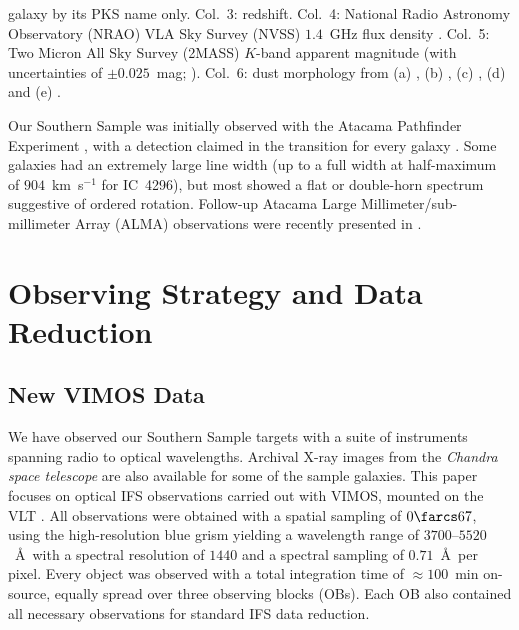 \documentclass[a4paper,fleqn,usenatbib]{mnras}
\begin{document}
\begin{table}[t]
\begin{center}
{      galaxy by its PKS name only. Col.~3: redshift. Col.~4: National
      Radio Astronomy Observatory (NRAO) VLA Sky Survey (NVSS)
      $1.4$~GHz flux density \citep{Condon1998}. Col.~5: Two Micron
      All Sky Survey (2MASS) $K$-band apparent magnitude (with
      uncertainties of $\pm0.025$~mag;
      \citealt{Skrutskie2006}). Col.~6: dust morphology from (a)
      \citet{Govoni2000}, (b) \citet{Lauer2005}, (c)
      \citet{Bettoni2001}, (d) \citet{Sandage1979} and (e)
      \citet{Colbert2001}.}
  \end{center}
\end{table}

Our Southern Sample was initially observed with the Atacama Pathfinder
Experiment \citep[APEX; ][]{Gusten2006}, with a detection claimed in
the  transition for every galaxy
\citep{Prandoni2012}. Some galaxies had an extremely large line width
(up to a full width at half-maximum of $904$~km~s$^{-1}$ for IC~4296),
but most showed a flat or double-horn spectrum suggestive of ordered
rotation. Follow-up Atacama Large Millimeter/sub-millimeter Array
(ALMA) observations were recently presented in \citet{ruffa2019,
  ruffa2020}.

\section{Observing Strategy and Data Reduction}
\label{sec:obs}

\subsection{New VIMOS Data}
\label{subsec:VIMOS}

We have observed our Southern Sample targets with a suite of
instruments spanning radio to optical wavelengths. Archival X-ray
images from the \textit{Chandra space telescope} are also available
for some of the sample galaxies. This paper focuses on optical IFS
observations carried out with VIMOS, mounted on the VLT
\citep{LeFevre2003}. All observations were obtained with a spatial
sampling of $0\farcs67$, using the high-resolution blue grism yielding
a wavelength range of $3700$--$5520$~\AA\ with a spectral resolution
of $1440$ and a spectral sampling of $0.71$~\AA\ per pixel. Every
object was observed with a total integration time of $\approx100$~min
on-source, equally spread over three observing blocks (OBs). Each OB
also contained all necessary observations for standard IFS data
reduction.
\end{document}
